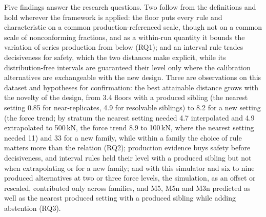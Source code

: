 \documentclass[pdflatex,sn-basic,lineno]{sn-jnl}
\begin{document}
Five findings answer the research questions. Two follow from the definitions and hold wherever the framework is applied: the floor puts every rule and characteristic on a common production-referenced scale, though not on a common scale of nonconforming fractions, and as a within-run quantity it bounds the variation of series production from below (RQ1); and an interval rule trades decisiveness for safety, which the two distances make explicit, while its distribution-free intervals are guaranteed their level only where the calibration alternatives are exchangeable with the new design. Three are observations on this dataset and hypotheses for confirmation: the best attainable distance grows with the novelty of the design, from 3.4 floors with a produced sibling (the nearest setting 0.85 for near-replicates, 4.9 for resolvable siblings) to 8.2 for a new setting (the force trend; by stratum the nearest setting needed 4.7 interpolated and 4.9 extrapolated to 500\,kN, the force trend 8.9 to 100\,kN, where the nearest setting needed 11) and 33 for a new family, while within a family the choice of rule matters more than the relation (RQ2); production evidence buys safety before decisiveness, and interval rules held their level with a produced sibling but not when extrapolating or for a new family; and with this simulator and six to nine produced alternatives at two or three force levels, the simulation, as an offset or rescaled, contributed only across families, and M5, M5n and M3n predicted as well as the nearest produced setting with a produced sibling while adding abstention (RQ3).
\end{document}
